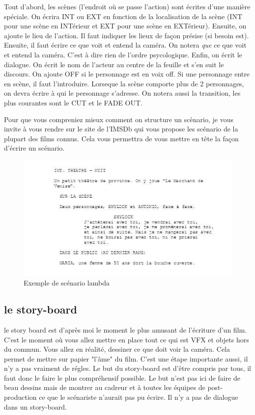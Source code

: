 \documentclass{article}
\begin{document}
\medskip

Tout d'abord, les scènes (l'endroit où se passe l'action) sont écrites d'une manière spéciale. On écrira INT ou EXT en fonction de la localisation de la scène (INT pour une scène en INTérieur et EXT pour une scène en EXTérieur). Ensuite, on ajoute le lieu de l'action. Il faut indiquer les lieux de façon présise (si besoin est).
Ensuite, il faut écrire ce que voit et entend la caméra. On notera \textit{que} ce que voit et entend la caméra. C'est à dire rien de l'ordre psycologique.
 Enfin, on écrit le dialogue. On écrit le nom de l'acteur au centre de la feuille et s'en suit le discours. On ajoute OFF si le personnage est en voix off. Si une personnage entre en scène, il faut l'introduire. Lorseque la scène comporte plus de 2 personnages, on devra écrire à qui le personnage s'adresse. On notera aussi la transition, les plus courantes sont le CUT et le FADE OUT. 

Pour que vous compreniez mieux comment on structure un scènario, je vous invite à vous rendre sur le site de l'IMSDb qui vous propose les scénario de la plupart des films connus. Cela vous permettra de vous mettre en tête la façon d'écrire un scénario.


\begin{figure}[h]
\centering
\includegraphics[scale=0.7]{img/scenario.jpg}
\caption{Exemple de scénario lambda}
\label{fig:scena}
\end{figure}

\clearpage


	\subsection{le story-board}
\label{sec:story}

le story board est d'après moi le moment le plus amusant de l'écriture d'un film. C'est le moment où vous allez mettre en place tout ce qui est VFX et objets hors du commun. Vous allez en réalité, dessiner ce que doit voir la caméra. Cela permet de mettre sur papier "l'âme" du film. C'est une étape importante aussi, il n'y a pas vraiment de régles. Le but du story-board est d'être compris par tous, il faut donc le faire le plus compréhensif possible. Le but n'est pas ici de faire de beau dessins mais de montrer au cadreur et à toutes les équipes de post-production ce que le scénariste n'aurait pas pu écrire. Il n'y a pas de dialogue dans un story-board.
\end{document}
